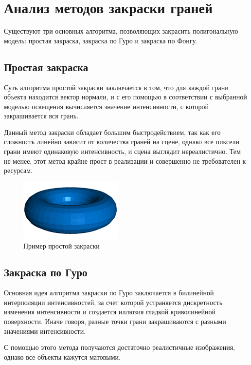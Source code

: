 \section{Анализ методов закраски граней}

Существуют три основных алгоритма, позволяющих закрасить полигональную модель: простая закраска, закраска по Гуро и закраска по Фонгу.

\subsection{Простая закраска}

Суть алгоритма простой закраски \cite{rogers_alg} заключается в том, что для каждой грани объекта находится вектор нормали, и с его помощью в соответствии с выбранной моделью освещения вычисляется значение интенсивности, с которой закрашивается вся грань.

Данный метод закраски обладает большим быстродействием, так как его сложность линейно зависит от количества граней на сцене, однако все пиксели грани имеют одинаковую интенсивность, и сцена выглядит нереалистично. Тем не менее, этот метод крайне прост в реализации и совершенно не требователен к ресурсам.

\begin{figure}[h]
	\centering
	\includegraphics[scale=0.7]{inc/img/simple.png}
	\caption{Пример простой закраски}
	\label{fig:simple}
\end{figure} 

\subsection{Закраска по Гуро}

Основная идея алгоритма закраски по Гуро \cite{rogers_alg} заключается в билинейной интерполяции интенсивностей, за счет которой устраняется дискретность изменения интенсивности и создается иллюзия гладкой криволинейной поверхности. Иначе говоря, разные точки грани закрашиваются с разными значениями интенсивности.

С помощью этого метода получаются достаточно реалистичные изображения, однако все объекты кажутся матовыми.


